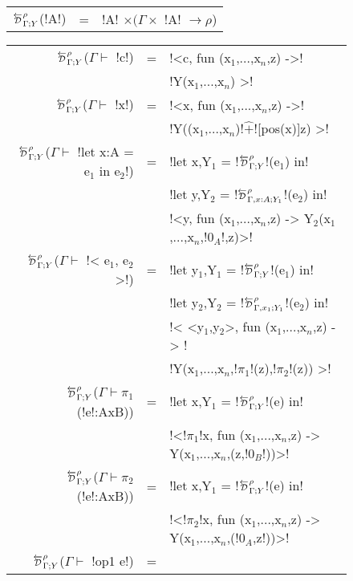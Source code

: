 \begin{figure*}[t]
    \begin{tabular}{r c l}
        $\directD{\rho}{\Gamma}{Y}$(!A!) &=&  !A! $\times (\Gamma \times$ !A! $\to \rho$)\\
    \end{tabular}
    \medskip

    \begin{tabular}{r c l}
        $\directD{\rho}{\Gamma}{Y}$($\Gamma\vdash $ !c!) &=& 
            !<c, fun (x$_{1}$,...,x$_n$,z) ->! \\
            && !Y(x$_{1}$,...,x$_{n}$) >!\\
        $\directD{\rho}{\Gamma}{Y}$($\Gamma\vdash $ !x!) &=& 
            !<x, fun (x$_{1}$,...,x$_n$,z) ->! \\
            && !Y((x$_{1}$,...,x$_n$)!$\widehat{+}$![pos(x)]z) >!\\
        $\directD{\rho}{\Gamma}{Y}$($\Gamma\vdash $ !let x:A = e$_{1}$ in e$_{2}$!) &=& 
            !let x,Y$_{1}$ = !$\directD{\rho}{\Gamma}{Y}$!(e$_{1}$) in! \\
            &&!let y,Y$_{2}$ = !$\directD{\rho}{\Gamma,x:A}{Y_1}$!(e$_{2}$) in!\\ 
            &&!<y, fun (x$_{1}$,...,x$_n$,z) -> Y$_{2}$(x$_{1}$,...,x$_n$,!$0_{A}$!,z)>!\\
        $\directD{\rho}{\Gamma}{Y}$($\Gamma\vdash $ !< e$_{1}$, e$_{2}$ >!) &=&
            !let y$_{1}$,Y$_{1}$ = !$\directD{\rho}{\Gamma}{Y}$!(e$_{1}$) in! \\
            &&!let y$_{2}$,Y$_{2}$ = !$\directD{\rho}{\Gamma,x_1}{Y_1}$!(e$_{2}$) in!\\
            &&!< <y$_{1}$,y$_{2}$>, fun (x$_{1}$,...,x$_n$,z) -> !\\
            &&!Y(x$_{1}$,...,x$_n$,!$\pi_1$!(z),!$\pi_2$!(z)) >!\\ 
        $\directD{\rho}{\Gamma}{Y}$($\Gamma\vdash \pi_1$(!e!:AxB)) &=&
            !let x,Y$_{1}$ = !$\directD{\rho}{\Gamma}{Y}$!(e) in! \\
            && !<!$\pi_1$!x, fun (x$_{1}$,...,x$_n$,z) -> Y(x$_{1}$,...,x$_n$,(z,!$0_B$!))>! \\
        $\directD{\rho}{\Gamma}{Y}$($\Gamma\vdash \pi_2$(!e!:AxB)) &=&
            !let x,Y$_{1}$ = !$\directD{\rho}{\Gamma}{Y}$!(e) in! \\
            && !<!$\pi_2$!x, fun (x$_{1}$,...,x$_n$,z) -> Y(x$_{1}$,...,x$_n$,(!$0_A$,z!))>! \\
        $\directD{\rho}{\Gamma}{Y}$($\Gamma\vdash $ !op1 e!) &=&  

\end{tabular}
\end{figure*}
